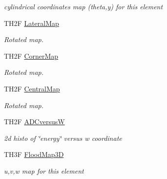 \begin{DoxyCompactItemize}
\begin{DoxyCompactList}\small\item\em cylindrical coordinates map (theta,y) for this element \end{DoxyCompactList}\item 
\hypertarget{classElement_a82cfb891b137602dc49bbb18c1039b5c}{T\+H2\+F \hyperlink{classElement_a82cfb891b137602dc49bbb18c1039b5c}{Lateral\+Map}}\label{classElement_a82cfb891b137602dc49bbb18c1039b5c}

\begin{DoxyCompactList}\small\item\em Rotated map. \end{DoxyCompactList}\item 
\hypertarget{classElement_ad01d15c50d4d01716f8d9d03162521f9}{T\+H2\+F \hyperlink{classElement_ad01d15c50d4d01716f8d9d03162521f9}{Corner\+Map}}\label{classElement_ad01d15c50d4d01716f8d9d03162521f9}

\begin{DoxyCompactList}\small\item\em Rotated map. \end{DoxyCompactList}\item 
\hypertarget{classElement_ac25c0eb24baee3f0b3228b6279791d21}{T\+H2\+F \hyperlink{classElement_ac25c0eb24baee3f0b3228b6279791d21}{Central\+Map}}\label{classElement_ac25c0eb24baee3f0b3228b6279791d21}

\begin{DoxyCompactList}\small\item\em Rotated map. \end{DoxyCompactList}\item 
\hypertarget{classElement_a62ed98e003ba00fee131353869cfe314}{T\+H2\+F \hyperlink{classElement_a62ed98e003ba00fee131353869cfe314}{A\+D\+Cversus\+W}}\label{classElement_a62ed98e003ba00fee131353869cfe314}

\begin{DoxyCompactList}\small\item\em 2d histo of \char`\"{}energy\char`\"{} versus w coordinate \end{DoxyCompactList}\item 
\hypertarget{classElement_a97f8372319c77f20eff4314a6f32c4ad}{T\+H3\+F \hyperlink{classElement_a97f8372319c77f20eff4314a6f32c4ad}{Flood\+Map3\+D}}\label{classElement_a97f8372319c77f20eff4314a6f32c4ad}

\begin{DoxyCompactList}\small\item\em u,v,w map for this element \end{DoxyCompactList}\end{DoxyCompactItemize}


